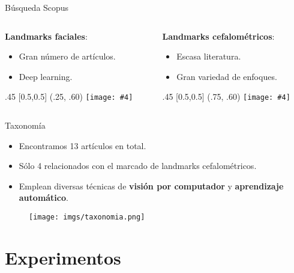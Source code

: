 \documentclass[aspectratio=43]{beamer}
\newcommand{\absimage}[4][0.5,0.5]{%
	\begin{textblock}{#3}%
		[#1]%
		(#2)%
		\texttt{[image: \#4]}%
\end{textblock}}
\begin{document}
\begin{frame}[t]{Búsqueda Scopus}

  \begin{columns}[onlytextwidth]
    \begin{column}{.5\textwidth}
      \textbf{Landmarks faciales}:
      \begin{itemize}
        \item Gran número de artículos.
        \item Deep learning.
      \end{itemize} 
      \absimage{.25, .60}{.45}{imgs/Scopus_1.png}
    \end{column}
    \begin{column}{.5\textwidth}
      \textbf{Landmarks cefalométricos}:
      \begin{itemize}
        \item Escasa literatura. \item Gran variedad de enfoques.
      \end{itemize}
      \absimage{.75, .60}{.45}{imgs/Scopus_2.png}
    \end{column}
  \end{columns}
\end{frame}

\begin{frame}[t]{Taxonomía}
  \begin{itemize}
    \item Encontramos 13 artículos en total.
    \item Sólo 4 relacionados con el marcado de landmarks cefalométricos.
    \item Emplean diversas técnicas de \textbf{visión por computador} y \textbf{aprendizaje automático}.
  \end{itemize}
  \begin{figure}
    \centering
    \texttt{[image: imgs/taxonomia.png]}
  \end{figure}
\end{frame}

\section{Experimentos}
\end{document}
